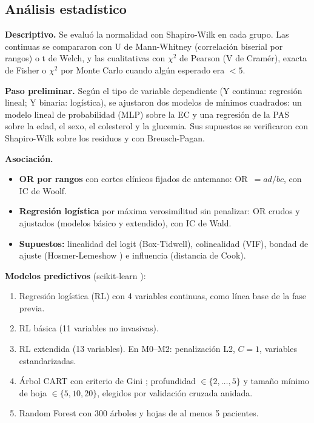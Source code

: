 \documentclass[twocolumn,10pt]{article}
\begin{document}
\subsection{An\'alisis estad\'istico}
\textbf{Descriptivo.} Se evalu\'o la normalidad con Shapiro-Wilk \cite{shapiro1965} en cada grupo. Las continuas se compararon con U de Mann-Whitney (correlaci\'on biserial por rangos) o t de Welch, y las cualitativas con $\chi^2$ de Pearson (V de Cram\'er), exacta de Fisher o $\chi^2$ por Monte Carlo cuando alg\'un esperado era $<5$.

\textbf{Paso preliminar.} Seg\'un el tipo de variable dependiente (Y continua: regresi\'on lineal; Y binaria: log\'istica), se ajustaron dos modelos de m\'inimos cuadrados: un modelo lineal de probabilidad (MLP) sobre la EC y una regresi\'on de la PAS sobre la edad, el sexo, el colesterol y la glucemia. Sus supuestos se verificaron con Shapiro-Wilk sobre los residuos y con Breusch-Pagan.

\textbf{Asociaci\'on.}
\begin{itemize}
\item \textbf{OR por rangos} con cortes cl\'inicos fijados de antemano: OR~$=ad/bc$, con IC de Woolf.
\item \textbf{Regresi\'on log\'istica} por m\'axima verosimilitud sin penalizar: OR crudos y ajustados (modelos b\'asico y extendido), con IC de Wald.
\item \textbf{Supuestos:} linealidad del logit (Box-Tidwell), colinealidad (VIF), bondad de ajuste (Hosmer-Lemeshow \cite{hosmer2013}) e influencia (distancia de Cook).
\end{itemize}

\textbf{Modelos predictivos} (scikit-learn \cite{pedregosa2011}):
\begin{enumerate}
\item[M0.] Regresi\'on log\'istica (RL) con 4 variables continuas, como l\'inea base de la fase previa.
\item[M1.] RL b\'asica (11 variables no invasivas).
\item[M2.] RL extendida (13 variables). En M0--M2: penalizaci\'on L2, $C=1$, variables estandarizadas.
\item[M3.] \'Arbol CART con criterio de Gini \cite{breiman1984}; profundidad $\in\{2,\dots,5\}$ y tama\~no m\'inimo de hoja $\in\{5,10,20\}$, elegidos por validaci\'on cruzada anidada.
\item[M4.] Random Forest \cite{breiman2001} con 300 \'arboles y hojas de al menos 5 pacientes.
\end{enumerate}
\end{document}

